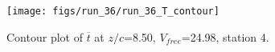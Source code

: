 \begin{figure}[H]
\centering
\texttt{[image: figs/run\_36/run\_36\_T\_contour]}
\caption{Contour plot of $\overline{t}$ at $z/c$=8.50, $V_{free}$=24.98, station 4.}
\label{fig:run_36_T_contour}
\end{figure}


